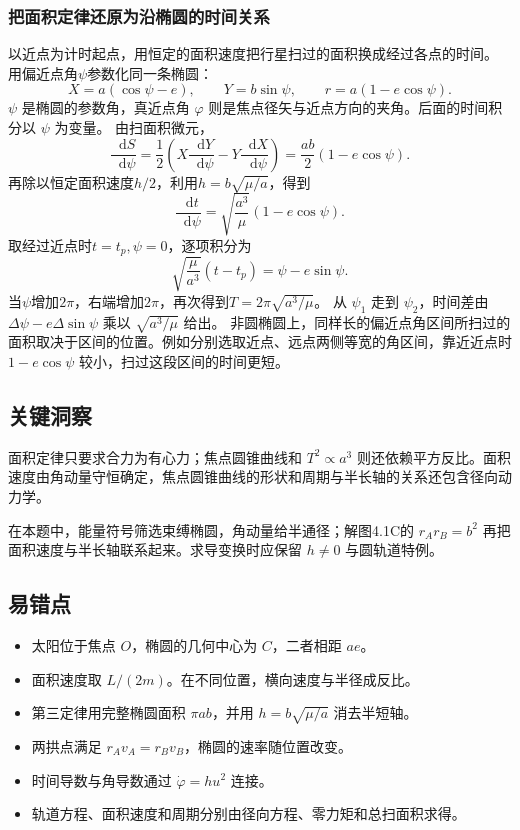 \documentclass[UTF8,fontset=fandol,a4paper,11pt]{ctexart}
\newcommand{\dd}{\mathop{}\!\mathrm{d}}
\begin{document}
\subsubsection*{把面积定律还原为沿椭圆的时间关系}
以近点为计时起点，用恒定的面积速度把行星扫过的面积换成经过各点的时间。
用偏近点角$\psi$参数化同一条椭圆：
\[
X=a(\cos\psi-e),\qquad Y=b\sin\psi,
\qquad r=a(1-e\cos\psi).
\]
$\psi$ 是椭圆的参数角，真近点角 $\varphi$ 则是焦点径矢与近点方向的夹角。后面的时间积分以 $\psi$ 为变量。
由扫面积微元，
\[
\frac{\dd S}{\dd\psi}
=\frac12\left(X\frac{\dd Y}{\dd\psi}-Y\frac{\dd X}{\dd\psi}\right)
=\frac{ab}{2}(1-e\cos\psi).
\]
再除以恒定面积速度$h/2$，利用$h=b\sqrt{\mu/a}$，得到
\[
\frac{\dd t}{\dd\psi}=\sqrt{\frac{a^3}\mu}(1-e\cos\psi).
\]
取经过近点时$t=t_p,\psi=0$，逐项积分为
\[
\boxed{\sqrt{\frac\mu{a^3}}(t-t_p)=\psi-e\sin\psi}.
\]
当$\psi$增加$2\pi$，右端增加$2\pi$，再次得到$T=2\pi\sqrt{a^3/\mu}$。
从 $\psi_1$ 走到 $\psi_2$，时间差由 $\Delta\psi-e\Delta\sin\psi$ 乘以 $\sqrt{a^3/\mu}$ 给出。
非圆椭圆上，同样长的偏近点角区间所扫过的面积取决于区间的位置。例如分别选取近点、远点两侧等宽的角区间，靠近近点时 $1-e\cos\psi$ 较小，扫过这段区间的时间更短。




\subsection*{关键洞察}

面积定律只要求合力为有心力；焦点圆锥曲线和 \(T^2\propto a^3\)
则还依赖平方反比。面积速度由角动量守恒确定，焦点圆锥曲线的形状和周期与半长轴的关系还包含径向动力学。

在本题中，能量符号筛选束缚椭圆，角动量给半通径；解图4.1C的
\(r_Ar_B=b^2\) 再把面积速度与半长轴联系起来。求导变换时应保留 \(h\ne0\)
与圆轨道特例。



\subsection*{易错点}

\begin{itemize}
\item 太阳位于焦点 $O$，椭圆的几何中心为 $C$，二者相距 $ae$。
\item 面积速度取 $L/(2m)$。在不同位置，横向速度与半径成反比。
\item 第三定律用完整椭圆面积 $\pi ab$，并用 $h=b\sqrt{\mu/a}$ 消去半短轴。
\item 两拱点满足 $r_Av_A=r_Bv_B$，椭圆的速率随位置改变。
\item 时间导数与角导数通过 $\dot\varphi=hu^2$ 连接。
\item 轨道方程、面积速度和周期分别由径向方程、零力矩和总扫面积求得。
\end{itemize}
\end{document}
